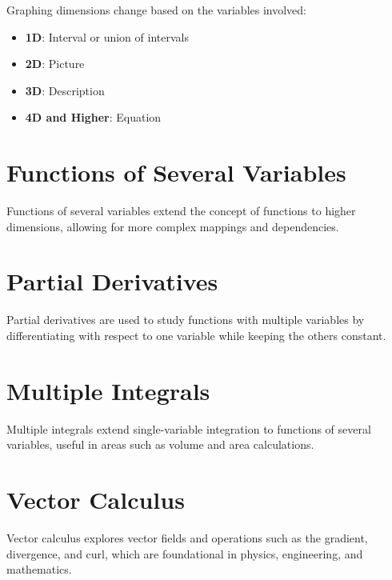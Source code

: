 \documentclass[a4paper,12pt,openany]{book}
\begin{document}
Graphing dimensions change based on the variables involved:
\begin{itemize}
    \item \textbf{1D}: Interval or union of intervals
    \item \textbf{2D}: Picture
    \item \textbf{3D}: Description
    \item \textbf{4D and Higher}: Equation
\end{itemize}

\chapter{Functions of Several Variables}
Functions of several variables extend the concept of functions to higher dimensions, allowing for more complex mappings and dependencies.


\chapter{Partial Derivatives}
Partial derivatives are used to study functions with multiple variables by differentiating with respect to one variable while keeping the others constant.


\chapter{Multiple Integrals}
Multiple integrals extend single-variable integration to functions of several variables, useful in areas such as volume and area calculations.


\chapter{Vector Calculus}
Vector calculus explores vector fields and operations such as the gradient, divergence, and curl, which are foundational in physics, engineering, and mathematics.
\end{document}
